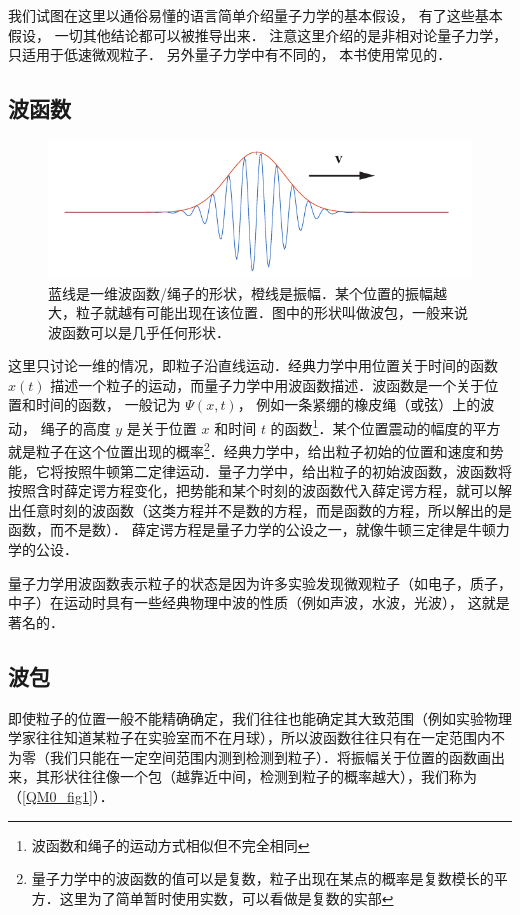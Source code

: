 

我们试图在这里以通俗易懂的语言简单介绍量子力学的基本假设， 有了这些基本假设， 一切其他结论都可以被推导出来． 注意这里介绍的是非相对论量子力学，只适用于低速微观粒子． 另外量子力学中有不同的， 本书使用常见的．

\subsection{波函数}

\begin{figure}[ht]
\centering
\includegraphics[width=12cm]{./figures/QM01.pdf}
\caption{蓝线是一维波函数/绳子的形状，橙线是振幅．某个位置的振幅越大，粒子就越有可能出现在该位置．图中的形状叫做波包，一般来说波函数可以是几乎任何形状．} \label{QM0_fig1}
\end{figure}

这里只讨论一维的情况，即粒子沿直线运动．经典力学中用位置关于时间的函数 $x(t)$ 描述一个粒子的运动，而量子力学中用波函数描述．波函数是一个关于位置和时间的函数， 一般记为 $\Psi(x, t)$， 例如一条紧绷的橡皮绳（或弦）上的波动， 绳子的高度 $y$ 是关于位置 $x$ 和时间 $t$ 的函数\footnote{波函数和绳子的运动方式相似但不完全相同}．某个位置震动的幅度的平方就是粒子在这个位置出现的概率\footnote{量子力学中的波函数的值可以是复数，粒子出现在某点的概率是复数模长的平方．这里为了简单暂时使用实数，可以看做是复数的实部}．经典力学中，给出粒子初始的位置和速度和势能，它将按照牛顿第二定律运动．量子力学中，给出粒子的初始波函数，波函数将按照含时薛定谔方程变化，把势能和某个时刻的波函数代入薛定谔方程，就可以解出任意时刻的波函数（这类方程并不是数的方程，而是函数的方程，所以解出的是函数，而不是数）． 薛定谔方程是量子力学的公设之一，就像牛顿三定律是牛顿力学的公设．

量子力学用波函数表示粒子的状态是因为许多实验发现微观粒子（如电子，质子，中子）在运动时具有一些经典物理中波的性质（例如声波，水波，光波）， 这就是著名的．

\subsection{波包}
即使粒子的位置一般不能精确确定，我们往往也能确定其大致范围（例如实验物理学家往往知道某粒子在实验室而不在月球），所以波函数往往只有在一定范围内不为零（我们只能在一定空间范围内测到检测到粒子）．将振幅关于位置的函数画出来，其形状往往像一个包（越靠近中间，检测到粒子的概率越大），我们称为（\autoref{QM0_fig1}）．

